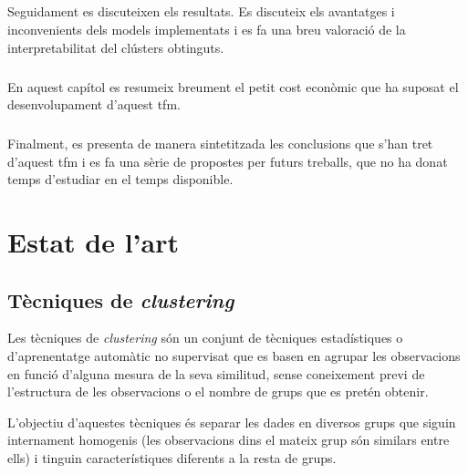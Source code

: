 \documentclass[CAT,BIB]{TFUOC}%
\begin{document}
    \paragraph{ }
        Seguidament es discuteixen els resultats.
        Es discuteix els avantatges i inconvenients
        dels models implementats
        i es fa una breu valoració de la interpretabilitat del clústers obtinguts.

    \paragraph{ }
        En aquest capítol es resumeix breument
        el petit cost econòmic que ha suposat
        el desenvolupament d'aquest \gls{tfm}.

    \paragraph{ }
        Finalment,
        es presenta de manera sintetitzada les conclusions
        que s'han tret d'aquest \gls{tfm}
        i es fa una sèrie de propostes
        per futurs treballs,
        que no ha donat temps d'estudiar en el temps disponible.


\chapter{Estat de l'art}
\label{c:state}

    \section{Tècniques de \textit{clustering}}
    \label{s:state_cluster}

        Les tècniques de \textit{clustering} són un conjunt de tècniques estadístiques o d'aprenentatge automàtic no supervisat que es basen en agrupar les observacions en funció d'alguna mesura de la seva similitud, sense coneixement previ de l'estructura de les observacions o el nombre de grups que es pretén obtenir.

        L'objectiu d'aquestes tècniques és separar les dades en diversos grups que siguin internament homogenis (les observacions dins el mateix grup són similars entre ells) i tinguin característiques diferents a la resta de grups.
\end{document}
